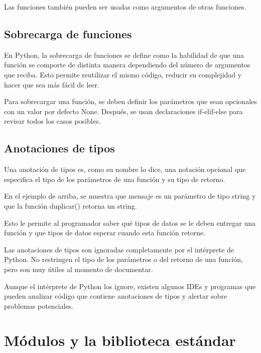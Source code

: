 \documentclass{report}
\begin{document}

Las funciones también pueden ser usadas como argumentos de otras funciones.


\section{Sobrecarga de funciones}

En Python, la sobrecarga de funciones se define como la habilidad de que una función se comporte de distinta manera dependiendo del número de argumentos que reciba. Esto permite reutilizar el mismo código, reducir su complejidad y hacer que sea más fácil de leer.

Para sobrecargar una función, se deben definir los parámetros que sean opcionales con un valor por defecto None. Después, se usan declaraciones if-elif-else para revisar todos los casos posibles.



\section{Anotaciones de tipos}

Una anotación de tipos es, como su nombre lo dice, una notación opcional que especifica el tipo de los parámetros de una función y su tipo de retorno.


En el ejemplo de arriba, se muestra que mensaje es un parámetro de tipo string y que la función duplicar() retorna un string.

Esto le permite al programador saber qué tipos de datos se le deben entregar una función y que tipos de datos esperar cuando esta función retorne.

Las anotaciones de tipos son ignoradas completamente por el intérprete de Python. No restringen el tipo de los parámetros o del retorno de una función, pero son muy útiles al momento de documentar.


Aunque el intérprete de Python los ignore, existen algunos IDEs y programas que pueden analizar código que contiene anotaciones de tipos y alertar sobre problemas potenciales.

\clearpage\chapter{Módulos y la biblioteca estándar}
\end{document}
